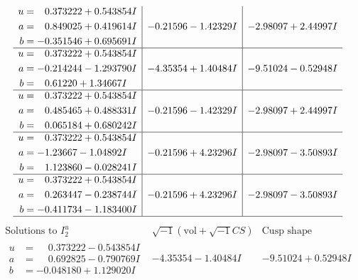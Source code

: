 \documentclass[1p]{elsarticle_modified}
\theoremstyle{definition}
\newcommand{\I}{\sqrt{-1}}
\begin{document}
$$\begin{array}{c|c|c}
\begin{aligned}
u &= \phantom{-}0.373222 + 0.543854 I \\
a &= \phantom{-}0.849025 + 0.419614 I \\
b &= -0.351546 + 0.695691 I\end{aligned}
 & -0.21596 - 1.42329 I & -2.98097 + 2.44997 I \\ \hline\begin{aligned}
u &= \phantom{-}0.373222 + 0.543854 I \\
a &= -0.214244 - 1.293790 I \\
b &= \phantom{-}0.61220 + 1.34667 I\end{aligned}
 & -4.35354 + 1.40484 I & -9.51024 - 0.52948 I \\ \hline\begin{aligned}
u &= \phantom{-}0.373222 + 0.543854 I \\
a &= \phantom{-}0.485465 + 0.488331 I \\
b &= \phantom{-}0.065184 + 0.680242 I\end{aligned}
 & -0.21596 - 1.42329 I & -2.98097 + 2.44997 I \\ \hline\begin{aligned}
u &= \phantom{-}0.373222 + 0.543854 I \\
a &= -1.23667 - 1.04892 I \\
b &= \phantom{-}1.123860 - 0.028241 I\end{aligned}
 & -0.21596 + 4.23296 I & -2.98097 - 3.50893 I \\ \hline\begin{aligned}
u &= \phantom{-}0.373222 + 0.543854 I \\
a &= \phantom{-}0.263447 - 0.238744 I \\
b &= -0.411734 - 1.183400 I\end{aligned}
 & -0.21596 + 4.23296 I & -2.98097 - 3.50893 I\\
 \hline 
 \end{array}$$\newpage$$\begin{array}{c|c|c}  
\text{Solutions to }I^u_{2}& \I (\text{vol} + \sqrt{-1}CS) & \text{Cusp shape}\\
 \hline 
\begin{aligned}
u &= \phantom{-}0.373222 - 0.543854 I \\
a &= \phantom{-}0.692825 - 0.790769 I \\
b &= -0.048180 + 1.129020 I\end{aligned}
 & -4.35354 - 1.40484 I & -9.51024 + 0.52948 I \\ \hline\begin{aligned}

\end{aligned}
\end{array}$$
\end{document}

